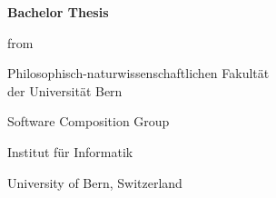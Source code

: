 \begin{titlepage}  
  \begin{center}  
  
  \begin{figure}[t]  
  \vspace*{-2cm}        %
  \vspace{1.2in}     
  \end{figure}

    \thispagestyle{empty}
    
    {\bfseries\Huge \thesistitle \par
    \Large \vspace{0.1in} \thesissubtitle \par}

    \vspace{0.3in} 
    \LARGE{\textbf{Bachelor Thesis} \\}
    \vspace{0.4in}

    {\Large \thesisauthor \par from \par \thesisauthorOrigin}
    
    \vspace{0.3in}
    {\Large Philosophisch-naturwissenschaftlichen Fakult\"{a}t \\
            der Universit\"{a}t Bern \par}
    \vspace{0.3in}
    {\Large \thesisdate \par}
    \vspace{0.3in}
   {\Large \thesisleiter} \par
      {\Large \thesisasst} \par
   \vspace{0.1in}
    {\Large Software Composition Group \par Institut f\"{u}r Informatik \par University of Bern, Switzerland \par}
  


\end{center}
\end{titlepage}
